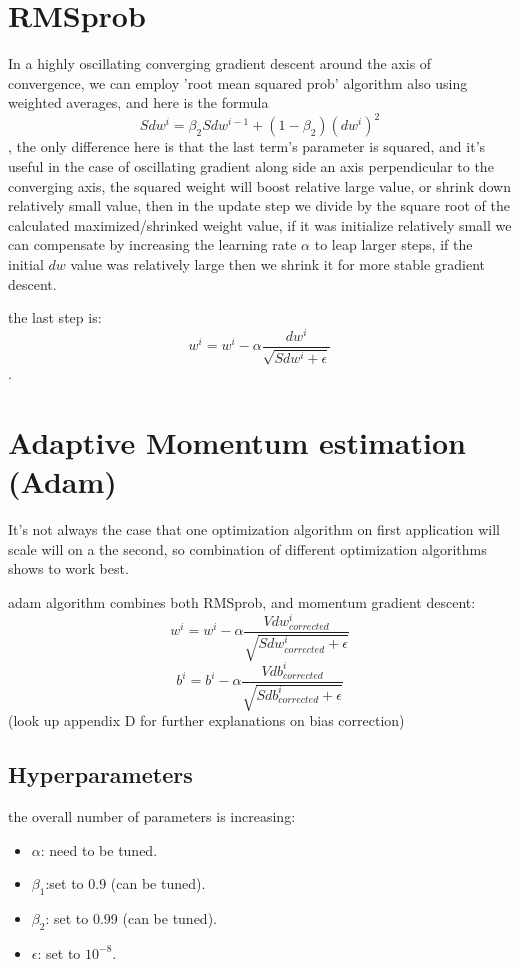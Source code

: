 \documentclass[4apaper,12pt]{book}
\begin{document}
\section{RMSprob}
\begin{description}
\item In a highly oscillating converging gradient descent around the axis of convergence, we can employ 'root mean squared prob' algorithm also using weighted averages, and here is the formula $$ Sdw^i = \beta_2 Sdw^{i-1} + (1-\beta_2) (dw^i)^2 $$, the only difference here is that the last term's parameter is squared, and it's useful in the case of oscillating gradient along side an axis perpendicular to the converging axis, the squared weight will boost relative large value, or shrink down relatively small value, then in the update step we divide by the square root of the calculated maximized/shrinked weight value, if it was initialize relatively small we can compensate by increasing the learning rate $\alpha$ to leap larger steps, if the initial $dw$ value was relatively large then we shrink it for more stable gradient descent.
\item the last step is: $$ w^i = w^i - \alpha \frac{dw^i}{\sqrt{Sdw^i + \epsilon}} $$.

\end{description}

\section{Adaptive Momentum estimation (Adam)}
\begin{description}
\item It's not always the case that one optimization algorithm on first application will scale will on a the second, so combination of different optimization algorithms shows to work best.
\item adam algorithm combines both RMSprob, and momentum gradient descent:
  $$ w^i = w^i - \alpha \frac{Vdw_{corrected}^i}{\sqrt{Sdw_{corrected}^i + \epsilon}} $$
  $$ b^i = b^i - \alpha \frac{Vdb_{corrected}^i}{\sqrt{Sdb_{corrected}^i + \epsilon}} $$
  (look up appendix D for further explanations on bias correction)
  \subsection {Hyperparameters}
  \begin{description}
  \item the overall number of parameters is increasing: \begin{itemize}
  \item $\alpha$: need to be tuned.
  \item $\beta_1$:set to 0.9 (can be tuned).
  \item $\beta_2$: set to 0.99 (can be tuned).
  \item $\epsilon$: set to $10^{-8}$.
  \end{itemize}
  \end{description}
\end{description}
\end{document}
